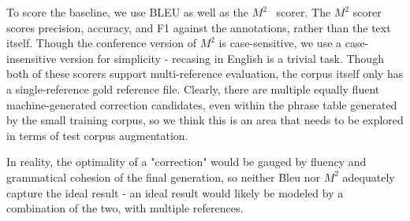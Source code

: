 \documentclass[11pt,letterpaper]{article}
\begin{document}
To score the baseline, we use BLEU as well as the $M^2$~\cite{M2} scorer. The $M^2$ scorer scores precision, accuracy, and F1 against the annotations, rather than the text itself. Though the conference version of $M^2$ is case-sensitive, we use a case-insensitive version for simplicity - recasing in English is a trivial task. Though both of these scorers support multi-reference evaluation, the corpus itself only has a single-reference gold reference file. Clearly, there are multiple equally fluent machine-generated correction candidates, even within the phrase table generated by the small training corpus, so we think this is an area that needs to be explored in terms of test corpus augmentation.

In reality, the optimality of a "correction" would be gauged by fluency and grammatical cohesion of the final generation, so neither Bleu nor $M^2$ adequately capture the ideal result - an ideal result would likely be modeled by a combination of the two, with multiple references. 
\end{document}
